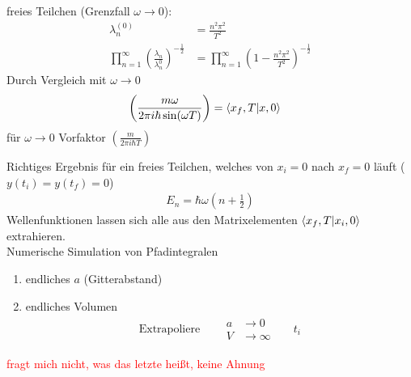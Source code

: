 freies Teilchen (Grenzfall $\omega \rightarrow 0$):
	\begin{align*}
		\lambda_n^{(0)} &= \frac{n^2 \pi^2}{T^2} \\
		\prod_{n=1}^{\infty} \left(\frac{\lambda_n}{\lambda_n^0}\right)^{-\frac{1}{2}} &=
		\prod_{n=1}^{\infty} \left(1 - \frac{n^2 \pi^2}{T^2}\right)^{-\frac{1}{2}}
	\end{align*}
Durch Vergleich mit $\omega \rightarrow 0$
	\begin{align*}
		\left(\frac{m \omega}{2 \pi i \hbar \sin(\omega T)}\right) &= 
		\braket{x_f , T | x, 0}
	\end{align*}
für $\omega \rightarrow 0$ Vorfaktor $\left(\frac{m}{2 \pi i \hbar T}\right)$

Richtiges Ergebnis für ein freies Teilchen, welches von $x_i = 0$ nach $x_f = 0$ läuft ($y(t_i)= y(t_f) = 0$) 
	\begin{align*}
		E_n = \hbar \omega\left(n + \frac{1}{2}\right)
	\end{align*}
Wellenfunktionen lassen sich alle aus den Matrixelementen $\braket{x_f, T | x_i , 0}$ extrahieren.
\\
Numerische Simulation von Pfadintegralen
	\begin{enumerate}[1)]
		\item endliches $a$ (Gitterabstand) 
		\item endliches Volumen
		\begin{align*}
			\text{Extrapoliere }& &
			\begin{aligned}
				a &\rightarrow 0 \\
				V &\rightarrow \infty
			\end{aligned}
			& &t_i
		\end{align*}
	\end{enumerate}
\textcolor{red}{fragt mich nicht, was das letzte heißt, keine Ahnung}

